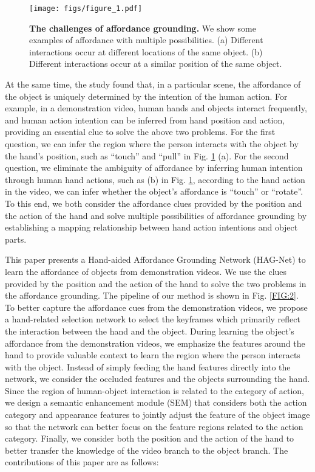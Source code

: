 \documentclass[journal,twoside]{IEEEtran}
\begin{document}
\begin{figure}[t]
	\centering
		\texttt{[image: figs/figure\_1.pdf]}
	\caption{\textbf{The challenges of affordance grounding.} We show some examples of affordance with multiple possibilities. (a) Different interactions occur at different locations of the same object. (b) Different interactions occur at a similar position of the same object.}
	\label{FIG:1}
\end{figure}

At the same time, the study \cite{heft1989affordances} found that, in a particular scene, the affordance of the object is uniquely determined by the intention of the human action. For example, in a demonstration video, human hands and objects interact frequently, and human action intention can be inferred from hand position and action, providing an essential clue to solve the above two problems. For the first question, we can infer the region where the person interacts with the object by the hand's position, such as ``touch'' and ``pull'' in Fig. \ref{FIG:1} (a). For the second question, we eliminate the ambiguity of affordance by inferring human intention through human hand actions, such as (b) in Fig. \ref{FIG:1}, according to the hand action in the video, we can infer whether the object's affordance is ``touch'' or ``rotate''. To this end, we both consider the affordance clues provided by the position and the action of the hand and solve multiple possibilities of affordance grounding by establishing a mapping relationship between hand action intentions and object parts.

This paper presents a Hand-aided Affordance Grounding Network (HAG-Net) to learn the affordance of objects from demonstration videos. We use the clues provided by the position and the action of the hand to solve the two problems in the affordance grounding. The pipeline of our method is shown in Fig. \ref{FIG:2}. To better capture the affordance cues from the demonstration videos, we propose a hand-related selection network to select the keyframes which primarily reflect the interaction between the hand and the object.  During learning the object's affordance from the demonstration videos, we emphasize the features around the hand to provide valuable context to learn the region where the person interacts with the object. Instead of simply feeding the hand features directly into the network, we consider the occluded features and the objects surrounding the hand. Since the region of human-object interaction is related to the category of action, we design a semantic enhancement module (SEM) that considers both the action category and appearance features to jointly adjust the feature of the object image so that the network can better focus on the feature regions related to the action category. Finally, we consider both the position and the action of the hand to better transfer the knowledge of the video branch to the object branch. The contributions of this paper are as follows:
\end{document}
